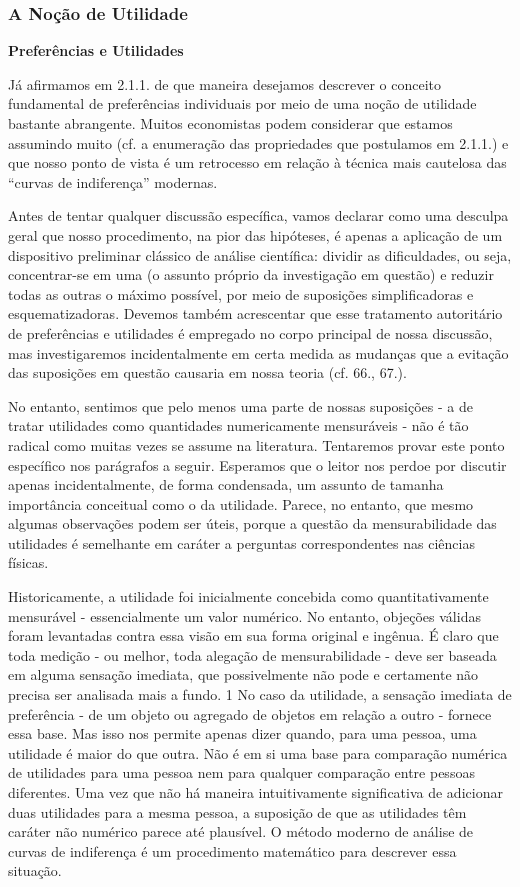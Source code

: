 \documentclass[12pt]{article}
\begin{document}
\subsubsection{\textbf{A Noção de Utilidade}}
\textbf{Preferências e Utilidades}

Já afirmamos em 2.1.1. de que maneira desejamos descrever o conceito fundamental de preferências individuais por meio de uma noção de utilidade bastante abrangente. Muitos economistas podem considerar que estamos assumindo muito (cf. a enumeração das propriedades que postulamos em 2.1.1.) e que nosso ponto de vista é um retrocesso em relação à técnica mais cautelosa das “curvas de indiferença” modernas.

Antes de tentar qualquer discussão específica, vamos declarar como uma desculpa geral que nosso procedimento, na pior das hipóteses, é apenas a aplicação de um dispositivo preliminar clássico de análise científica: dividir as dificuldades, ou seja, concentrar-se em uma (o assunto próprio da investigação em questão) e reduzir todas as outras o máximo possível, por meio de suposições simplificadoras e esquematizadoras. Devemos também acrescentar que esse tratamento autoritário de preferências e utilidades é empregado no corpo principal de nossa discussão, mas investigaremos incidentalmente em certa medida as mudanças que a evitação das suposições em questão causaria em nossa teoria (cf. 66., 67.).

No entanto, sentimos que pelo menos uma parte de nossas suposições - a de tratar utilidades como quantidades numericamente mensuráveis - não é tão radical como muitas vezes se assume na literatura. Tentaremos provar este ponto específico nos parágrafos a seguir. Esperamos que o leitor nos perdoe por discutir apenas incidentalmente, de forma condensada, um assunto de tamanha importância conceitual como o da utilidade. Parece, no entanto, que mesmo algumas observações podem ser úteis, porque a questão da mensurabilidade das utilidades é semelhante em caráter a perguntas correspondentes nas ciências físicas.

Historicamente, a utilidade foi inicialmente concebida como quantitativamente mensurável - essencialmente um valor numérico. No entanto, objeções válidas foram levantadas contra essa visão em sua forma original e ingênua. É claro que toda medição - ou melhor, toda alegação de mensurabilidade - deve ser baseada em alguma sensação imediata, que possivelmente não pode e certamente não precisa ser analisada mais a fundo. 1 No caso da utilidade, a sensação imediata de preferência - de um objeto ou agregado de objetos em relação a outro - fornece essa base. Mas isso nos permite apenas dizer quando, para uma pessoa, uma utilidade é maior do que outra. Não é em si uma base para comparação numérica de utilidades para uma pessoa nem para qualquer comparação entre pessoas diferentes. Uma vez que não há maneira intuitivamente significativa de adicionar duas utilidades para a mesma pessoa, a suposição de que as utilidades têm caráter não numérico parece até plausível. O método moderno de análise de curvas de indiferença é um procedimento matemático para descrever essa situação.
\end{document}
